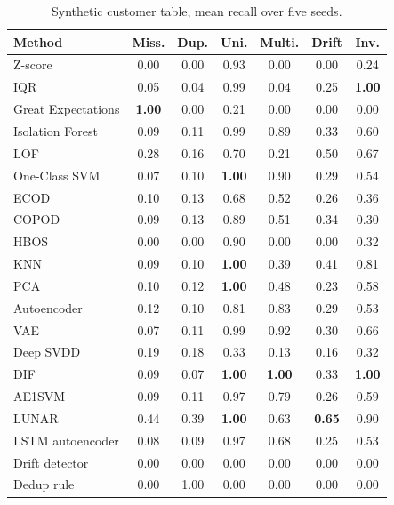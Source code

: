 \documentclass[conference]{IEEEtran}
\begin{document}
\begin{table}[t]
\caption{Synthetic customer table, mean recall over five seeds.}
\label{tab:m-customer}
\centering
\footnotesize
\setlength{\tabcolsep}{3pt}
\begin{tabular}{lcccccc}
\toprule
Method & Miss. & Dup. & Uni. & Multi. & Drift & Inv. \\
\midrule
Z-score            & 0.00 & 0.00 & 0.93 & 0.00 & 0.00 & 0.24 \\
IQR                & 0.05 & 0.04 & 0.99 & 0.04 & 0.25 & \textbf{1.00} \\
Great Expectations & \textbf{1.00} & 0.00 & 0.21 & 0.00 & 0.00 & 0.00 \\
\midrule
Isolation Forest   & 0.09 & 0.11 & 0.99 & 0.89 & 0.33 & 0.60 \\
LOF                & 0.28 & 0.16 & 0.70 & 0.21 & 0.50 & 0.67 \\
One-Class SVM      & 0.07 & 0.10 & \textbf{1.00} & 0.90 & 0.29 & 0.54 \\
ECOD               & 0.10 & 0.13 & 0.68 & 0.52 & 0.26 & 0.36 \\
COPOD              & 0.09 & 0.13 & 0.89 & 0.51 & 0.34 & 0.30 \\
HBOS               & 0.00 & 0.00 & 0.90 & 0.00 & 0.00 & 0.32 \\
KNN                & 0.09 & 0.10 & \textbf{1.00} & 0.39 & 0.41 & 0.81 \\
PCA                & 0.10 & 0.12 & \textbf{1.00} & 0.48 & 0.23 & 0.58 \\
\midrule
Autoencoder        & 0.12 & 0.10 & 0.81 & 0.83 & 0.29 & 0.53 \\
VAE                & 0.07 & 0.11 & 0.99 & 0.92 & 0.30 & 0.66 \\
Deep SVDD          & 0.19 & 0.18 & 0.33 & 0.13 & 0.16 & 0.32 \\
DIF                & 0.09 & 0.07 & \textbf{1.00} & \textbf{1.00} & 0.33 & \textbf{1.00} \\
AE1SVM             & 0.09 & 0.11 & 0.97 & 0.79 & 0.26 & 0.59 \\
LUNAR              & 0.44 & 0.39 & \textbf{1.00} & 0.63 & \textbf{0.65} & 0.90 \\
\midrule
LSTM autoencoder   & 0.08 & 0.09 & 0.97 & 0.68 & 0.25 & 0.53 \\
Drift detector     & 0.00 & 0.00 & 0.00 & 0.00 & 0.00 & 0.00 \\
Dedup rule         & 0.00 & 1.00 & 0.00 & 0.00 & 0.00 & 0.00 \\
\bottomrule
\end{tabular}
\end{table}
\end{document}
